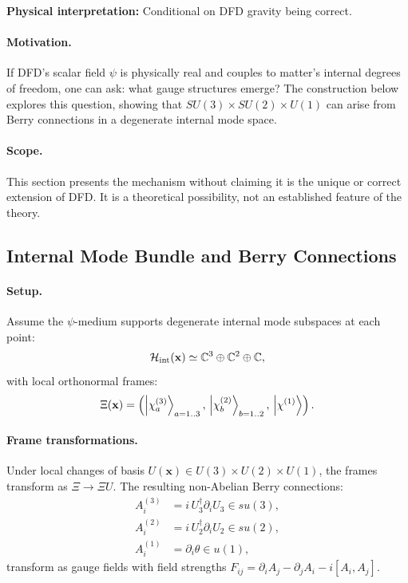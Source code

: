 \textbf{Physical interpretation:} Conditional on DFD gravity being correct.


\paragraph{Motivation.}
If DFD's scalar field $\psi$ is physically real and couples to matter's internal degrees of freedom, one can ask: what gauge structures emerge? The construction below explores this question, showing that $SU(3) \times SU(2) \times U(1)$ can arise from Berry connections in a degenerate internal mode space.

\paragraph{Scope.}
This section presents the mechanism without claiming it is the unique or correct extension of DFD. It is a theoretical possibility, not an established feature of the theory.

\subsection{Internal Mode Bundle and Berry Connections}\label{sec:quantum-berry}

\paragraph{Setup.}
Assume the $\psi$-medium supports degenerate internal mode subspaces at each point:
\begin{equation}
\mathcal{H}_{\rm int}(\mathbf{x}) \simeq \mathbb{C}^3 \oplus \mathbb{C}^2 \oplus \mathbb{C},
\end{equation}
with local orthonormal frames:
\begin{equation}
\Xi(\mathbf{x}) = \left(\ket{\chi_a^{(3)}}_{a=1..3},\, \ket{\chi_b^{(2)}}_{b=1..2},\, \ket{\chi^{(1)}}\right).
\end{equation}

\paragraph{Frame transformations.}
Under local changes of basis $U(\mathbf{x}) \in U(3) \times U(2) \times U(1)$, the frames transform as $\Xi \to \Xi U$. The resulting non-Abelian Berry connections:
\begin{align}
A_i^{(3)} &= i\, U_3^\dagger \partial_i U_3 \in su(3), \\
A_i^{(2)} &= i\, U_2^\dagger \partial_i U_2 \in su(2), \\
A_i^{(1)} &= \partial_i \theta \in u(1),
\end{align}
transform as gauge fields with field strengths $F_{ij} = \partial_i A_j - \partial_j A_i - i[A_i, A_j]$.

